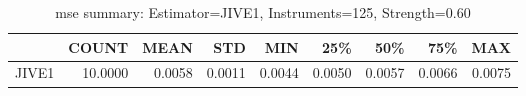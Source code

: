 \begin{table}[ht]
\centering
\caption{mse summary: Estimator=JIVE1, Instruments=125, Strength=0.60}
\begin{tabular}{lrrrrrrrr}
\toprule
 & COUNT & MEAN & STD & MIN & 25\% & 50\% & 75\% & MAX \\
\midrule
JIVE1 & 10.0000 & 0.0058 & 0.0011 & 0.0044 & 0.0050 & 0.0057 & 0.0066 & 0.0075 \\
\bottomrule
\end{tabular}
\end{table}
